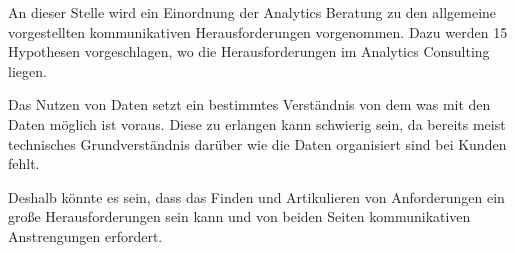 \documentclass[../main.tex]{subfiles}
\begin{document}
An dieser Stelle wird ein Einordnung der Analytics Beratung zu den allgemeine vorgestellten kommunikativen Herausforderungen vorgenommen.
Dazu werden 15 Hypothesen vorgeschlagen, wo die Herausforderungen im Analytics Consulting liegen.

Das Nutzen von Daten setzt ein bestimmtes Verständnis von dem was mit den Daten möglich ist voraus.
Diese zu erlangen kann schwierig sein, da bereits meist technisches Grundverständnis darüber wie die Daten organisiert sind bei Kunden fehlt.
\autocite{tsai2015big}

Deshalb könnte es sein, dass das Finden und Artikulieren von Anforderungen ein große Herausforderungen sein kann und von beiden Seiten kommunikativen Anstrengungen erfordert.
\end{document}
